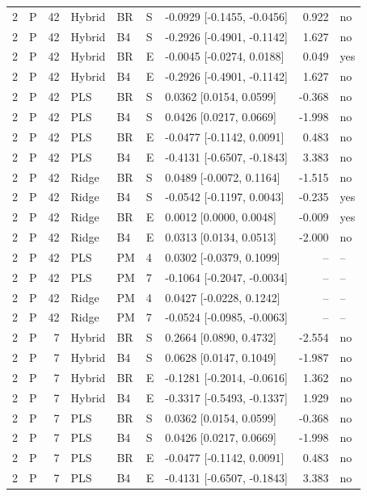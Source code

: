 \documentclass[10pt,a4paper]{article}
\begin{document}
\begin{longtable}{rlrllllrl}
2 & P & 42 & Hybrid & BR & S & -0.0929 [-0.1455, -0.0456] & 0.922 & no \\
2 & P & 42 & Hybrid & B4 & S & -0.2926 [-0.4901, -0.1142] & 1.627 & no \\
2 & P & 42 & Hybrid & BR & E & -0.0045 [-0.0274, 0.0188] & 0.049 & yes \\
2 & P & 42 & Hybrid & B4 & E & -0.2926 [-0.4901, -0.1142] & 1.627 & no \\
2 & P & 42 & PLS & BR & S & 0.0362 [0.0154, 0.0599] & -0.368 & no \\
2 & P & 42 & PLS & B4 & S & 0.0426 [0.0217, 0.0669] & -1.998 & no \\
2 & P & 42 & PLS & BR & E & -0.0477 [-0.1142, 0.0091] & 0.483 & no \\
2 & P & 42 & PLS & B4 & E & -0.4131 [-0.6507, -0.1843] & 3.383 & no \\
2 & P & 42 & Ridge & BR & S & 0.0489 [-0.0072, 0.1164] & -1.515 & no \\
2 & P & 42 & Ridge & B4 & S & -0.0542 [-0.1197, 0.0043] & -0.235 & yes \\
2 & P & 42 & Ridge & BR & E & 0.0012 [0.0000, 0.0048] & -0.009 & yes \\
2 & P & 42 & Ridge & B4 & E & 0.0313 [0.0134, 0.0513] & -2.000 & no \\
2 & P & 42 & PLS & PM & 4 & 0.0302 [-0.0379, 0.1099] & -- & -- \\
2 & P & 42 & PLS & PM & 7 & -0.1064 [-0.2047, -0.0034] & -- & -- \\
2 & P & 42 & Ridge & PM & 4 & 0.0427 [-0.0228, 0.1242] & -- & -- \\
2 & P & 42 & Ridge & PM & 7 & -0.0524 [-0.0985, -0.0063] & -- & -- \\
2 & P & 7 & Hybrid & BR & S & 0.2664 [0.0890, 0.4732] & -2.554 & no \\
2 & P & 7 & Hybrid & B4 & S & 0.0628 [0.0147, 0.1049] & -1.987 & no \\
2 & P & 7 & Hybrid & BR & E & -0.1281 [-0.2014, -0.0616] & 1.362 & no \\
2 & P & 7 & Hybrid & B4 & E & -0.3317 [-0.5493, -0.1337] & 1.929 & no \\
2 & P & 7 & PLS & BR & S & 0.0362 [0.0154, 0.0599] & -0.368 & no \\
2 & P & 7 & PLS & B4 & S & 0.0426 [0.0217, 0.0669] & -1.998 & no \\
2 & P & 7 & PLS & BR & E & -0.0477 [-0.1142, 0.0091] & 0.483 & no \\
2 & P & 7 & PLS & B4 & E & -0.4131 [-0.6507, -0.1843] & 3.383 & no \\

\end{longtable}
\end{document}
